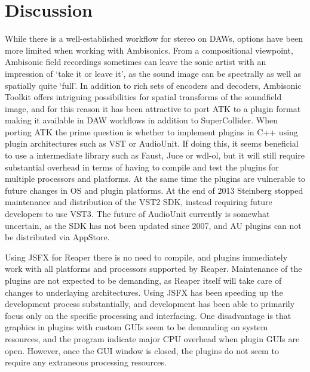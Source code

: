 \documentclass{article}
\begin{document}





\section{Discussion}\label{sec:discussion}

While there is a well-established workflow for stereo on DAWs, options have been more limited when working with Ambisonics.
From a compositional viewpoint, Ambisonic field recordings sometimes can leave the sonic artist with an impression of `take it or leave it', as the sound image can be spectrally as well as spatially quite `full'.
In addition to rich sets of encoders and decoders, Ambisonic Toolkit offers intriguing possibilities for spatial transforms of the soundfield image, and for this reason it has been attractive to port ATK to a plugin format making it available in DAW workflows in addition to SuperCollider.
When porting ATK the prime question is whether to implement plugins in C++ using plugin architectures such as VST or AudioUnit.
If doing this, it seems beneficial to use a intermediate library such as Faust, Juce or wdl-ol, but it will still require substantial overhead in terms of having to compile and test the plugins for multiple processors and platforms.
At the same time the plugins are vulnerable to future changes in OS and plugin platforms.
At the end of 2013 Steinberg stopped maintenance and distribution of the VST2 SDK, instead requiring future developers to use VST3. The future of AudioUnit currently is somewhat uncertain, as the SDK has not been updated since 2007, and AU plugins can not be distributed via AppStore.

Using JSFX for Reaper there is no need to compile, and plugins immediately work with all platforms and processors supported by Reaper.
Maintenance of the plugins are not expected to be demanding, as Reaper itself will take care of changes to underlaying architectures.
Using JSFX has been speeding up the development process substantially, and development has been able to primarily focus only on the specific processing and interfacing.
One disadvantage is that graphics in plugins with custom GUIs seem to be demanding on system resources, and the program indicate major CPU overhead when plugin GUIs are open.
However, once the GUI window is closed, the plugins do not seem to require any extraneous processing resources.
\end{document}
